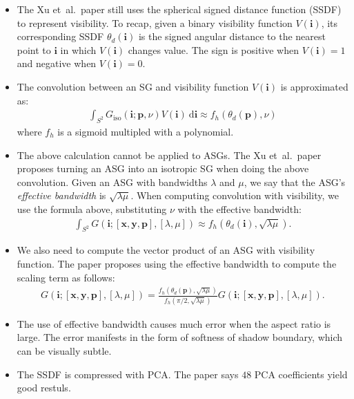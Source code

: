 \documentclass[10pt]{article}
\newcommand{\dee}{\mathrm{d}}
\newcommand{\ve}[1]{\mathbf{#1}}
\newcommand{\etal}{{et~al.}}
\begin{document}
  \begin{itemize}
    \item The Xu \etal\ paper still uses the spherical signed distance function (SSDF) to represent visibility.  To recap, given a binary visibility function $V(\ve{i})$, its corresponding SSDF $\theta_d(\ve{i})$ is the signed angular distance to the nearest point to $\ve{i}$ in which $V(\ve{i})$ changes value.  The sign is positive when $V(\ve{i}) = 1$ and negative when $V(\ve{i}) = 0$.

    \item The convolution between an SG and visibility function $V(\ve{i})$ is approximated as:
    \begin{align*}
      \int_{S^2} G_{\mathrm{iso}}(\ve{i};\ve{p}, \nu) V(\ve{i})\ \dee\ve{i} \approx f_h(\theta_d(\ve{p}), \nu)
    \end{align*}
    where $f_h$ is a sigmoid multipled with a polynomial.

    \item The above calculation cannot be applied to ASGs.  The Xu \etal\ paper proposes turning an ASG into an isotropic SG when doing the above convolution.  Given an ASG with bandwidths $\lambda$ and $\mu$, we say that the ASG's \emph{effective bandwidth} is $\sqrt{\lambda\mu}$.  When computing convolution with visibility, we use the formula above, substituting $\nu$ with the effective bandwidth:
    \begin{align*}
      \int_{S^2} G(\ve{i}; [\ve{x}, \ve{y}, \ve{p}], [\lambda,\mu]) \approx f_h(\theta_d(\ve{i}), \sqrt{\lambda \mu}).
    \end{align*}

    \item We also need to compute the vector product of an ASG with visibility function.  The paper proposes using the effective bandwidth to compute the scaling term as follows:
    \begin{align*}
      G(\ve{i};[\ve{x}, \ve{y}, \ve{p}], [\lambda,\mu])
      = \frac{f_h(\theta_d(\ve{p}), \sqrt{\lambda\mu})}{f_h(\pi/2, \sqrt{\lambda\mu})}
      G(\ve{i};[\ve{x},\ve{y},\ve{p}],[\lambda, \mu]).
    \end{align*}

    \item The use of effective bandwidth causes much error when the aspect ratio is large.  The error manifests in the form of softness of shadow boundary, which can be visually subtle.

    \item The SSDF is compressed with PCA.  The paper says $48$ PCA coefficients yield good restuls.
  \end{itemize}
\end{document}
